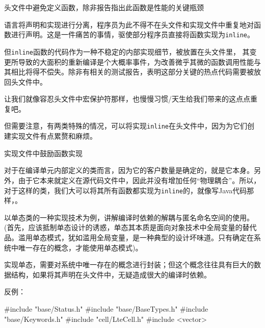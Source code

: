 \begin{content}

\begin{regulation}
头文件中避免定义函数，除非报告指出此函数是性能的关键瓶颈
\end{regulation}

\cpp{}语言将声明和实现进行分离，程序员为此不得不在头文件和实现文件中重复地对函数进行声明。这是一件痛苦的事情，驱使部分程序员直接将函数实现为\texttt{inline}。

但\texttt{inline}函数的代码作为一种不稳定的内部实现细节，被放置在头文件里，
其变更所导致的大面积的重新编译是个大概率事件，为改善微乎其微的函数调用性能与其相比将得不偿失。除非有相关的测试报告，表明这部分关键的热点代码需要被放回头文件中。

让我们就像容忍头文件中宏保护符那样，也慢慢习惯\clang{}/\cpp{}天生给我们带来的这点点重复吧。

但需要注意，有两类特殊的情况，可以将实现\texttt{inline}在头文件中，因为为它们创建实现文件有点累赘和麻烦。

\begin{enum}
\end{enum}

\begin{regulation}
实现文件中鼓励函数实现
\end{regulation}

对于在编译单元内部定义的类而言，因为它的客户数量是确定的，就是它本身。另外，由于它本来就定义在源代码文件中，因此并没有增加任何“物理耦合”。所以，对于这样的类，我们大可以将其所有函数都实现为\texttt{inline}的，就像写Java代码那样，。

以单态类的一种实现技术为例，讲解编译时依赖的解耦与匿名命名空间的使用。(首先，应该抵制单态设计的诱惑，单态其本质是面向对象技术中全局变量的替代品。滥用单态模式，犹如滥用全局变量，是一种典型的设计坏味道。只有确定在系统中唯一存在的概念，才能使用单态模式)。

实现单态，需要对系统中唯一存在的概念进行封装；但这个概念往往具有巨大的数据结构，如果将其声明在头文件中，无疑造成很大的编译时依赖。

反例：
\begin{leftbar}
\begin{c++}
#include "base/Status.h"
#include "base/BaseTypes.h"
#include "base/Keywords.h"
#include "cell/LteCell.h"
#include <vector>


\end{c++}
\end{leftbar}
\end{content}

